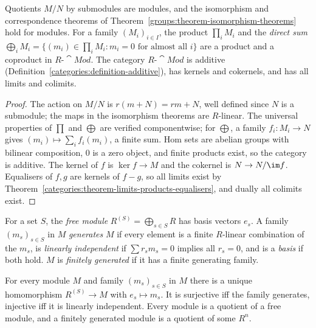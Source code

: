 \begin{proposition}\label{rings:proposition-module-basics}
Quotients $M/N$ by submodules are modules, and the isomorphism and correspondence
theorems of Theorem~\ref{groups:theorem-isomorphism-theorems} hold for modules. For a
family $(M_i)_{i \in I}$, the product $\prod_i M_i$ and the \emph{direct sum}
$\bigoplus_i M_i = \{(m_i) \in \prod_i M_i : m_i = 0 \text{ for almost all } i\}$ are a product and a
coproduct in $R\text{-}\cat{Mod}$. The category $R\text{-}\cat{Mod}$ is additive
(Definition~\ref{categories:definition-additive}), has kernels and cokernels, and has
all limits and colimits.
\end{proposition}

\begin{proof}
The action on $M/N$ is $r(m + N) = rm + N$, well defined since $N$ is a submodule; the
maps in the isomorphism theorems are $R$-linear. The universal properties of $\prod$ and
$\bigoplus$ are verified componentwise; for $\bigoplus$, a family $f_i \colon M_i \to N$ gives
$(m_i) \mapsto \sum_i f_i(m_i)$, a finite sum. Hom sets are abelian groups with bilinear
composition, $0$ is a zero object, and finite products exist, so the category is
additive. The kernel of $f$ is $\ker f \to M$ and the cokernel is $N \to N/\im f$.
Equalisers of $f, g$ are kernels of $f - g$, so all limits exist by
Theorem~\ref{categories:theorem-limits-products-equalisers}, and dually all colimits
exist.
\end{proof}

\begin{definition}\label{rings:definition-free-module}
For a set $S$, the \emph{free module} $R^{(S)} = \bigoplus_{s \in S} R$ has basis vectors
$e_s$. A family $(m_s)_{s \in S}$ in $M$ \emph{generates} $M$ if every element is a finite
$R$-linear combination of the $m_s$, is \emph{linearly independent} if
$\sum r_s m_s = 0$ implies all $r_s = 0$, and is a \emph{basis} if both hold. $M$ is
\emph{finitely generated} if it has a finite generating family.
\end{definition}

\begin{proposition}\label{rings:proposition-free-module}
For every module $M$ and family $(m_s)_{s \in S}$ in $M$ there is a unique homomorphism
$R^{(S)} \to M$ with $e_s \mapsto m_s$. It is surjective iff the family generates, injective
iff it is linearly independent. Every module is a quotient of a free module, and a
finitely generated module is a quotient of some $R^n$.
\end{proposition}


